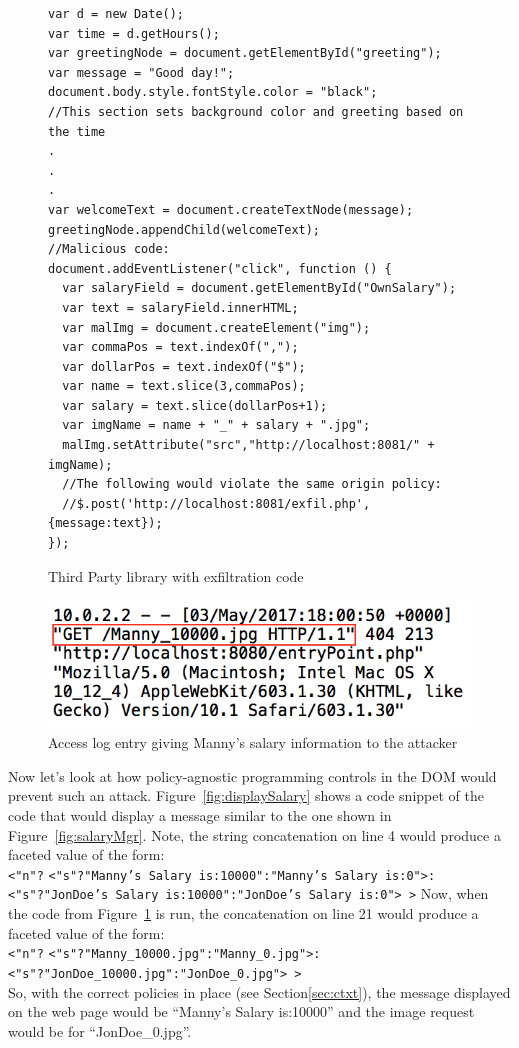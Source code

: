 \begin{figure}
  \begin{lstlisting}
var d = new Date();
var time = d.getHours();
var greetingNode = document.getElementById("greeting");
var message = "Good day!";
document.body.style.fontStyle.color = "black";
//This section sets background color and greeting based on the time
.
.
.
var welcomeText = document.createTextNode(message);
greetingNode.appendChild(welcomeText);
//Malicious code:
document.addEventListener("click", function () {
  var salaryField = document.getElementById("OwnSalary");
  var text = salaryField.innerHTML;
  var malImg = document.createElement("img");
  var commaPos = text.indexOf(",");
  var dollarPos = text.indexOf("$");
  var name = text.slice(3,commaPos);
  var salary = text.slice(dollarPos+1);
  var imgName = name + "_" + salary + ".jpg";
  malImg.setAttribute("src","http://localhost:8081/" + imgName);
  //The following would violate the same origin policy:
  //$.post('http://localhost:8081/exfil.php',{message:text});
});
  \end{lstlisting}
  \caption{Third Party library with exfiltration code}
  \label{fig:trudyLib}
\end{figure}

\begin{figure}
  \centering
  \includegraphics[scale=0.5, frame]{images/accessLog}
  \caption{Access log entry giving Manny's salary information to the attacker}
  \label{fig:accessLog}
\end{figure}

Now let's look at how policy-agnostic programming controls in the DOM would prevent
such an attack. Figure~\ref{fig:displaySalary} shows a code snippet of the code
that would display a message similar to the one shown in Figure~\ref{fig:salaryMgr}.
Note, the string concatenation on line 4 would produce a faceted value of the
form:\\
\indent \texttt{<"n"?}
  \texttt{<"s"?"Manny's Salary is:10000":"Manny's Salary is:0">:}\\
  \indent\indent\texttt{<"s"?"JonDoe's Salary is:10000":"JonDoe's Salary is:0">~>}
\noindent \eject
Now, when the code from Figure~\ref{fig:trudyLib} is run, the concatenation on line
21 would produce a faceted value of the form:\\
\indent \texttt{<"n"?}
\texttt{<"s"?"Manny\_10000.jpg":"Manny\_0.jpg">:}\\
\indent\indent\texttt{<"s"?"JonDoe\_10000.jpg":"JonDoe\_0.jpg">~>}
\noindent \\
So, with the correct policies in place (see Section\ref{sec:ctxt}), the message
displayed on the web page would be ``Manny's Salary is:10000'' and the image request
would be for ``JonDoe\_0.jpg''.

